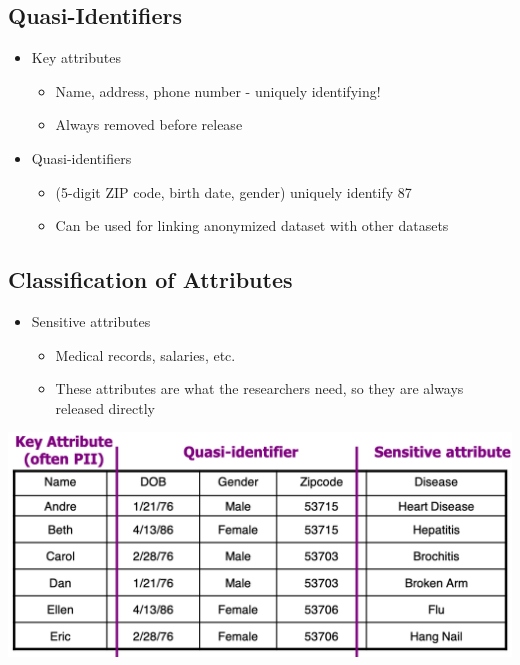 \documentclass[11pt]{article}
\theoremstyle{definition}
\begin{document}
\subsection{Quasi-Identifiers}
\begin{itemize}
    \item Key attributes
    \begin{itemize}
        \item Name, address, phone number - uniquely identifying!
        \item Always removed before release
    \end{itemize}
    \item Quasi-identifiers
    \begin{itemize}
        \item (5-digit ZIP code, birth date, gender) uniquely identify 87%
        \item Can be used for linking anonymized dataset with other datasets
    \end{itemize}
\end{itemize}

\subsection{Classification of Attributes}
\begin{itemize}
    \item Sensitive attributes
    \begin{itemize}
        \item Medical records, salaries, etc.
        \item These attributes are what the researchers need, so they are always released directly
    \end{itemize}
\end{itemize}
\includegraphics[width=\textwidth/2]{16.png}
\end{document}
